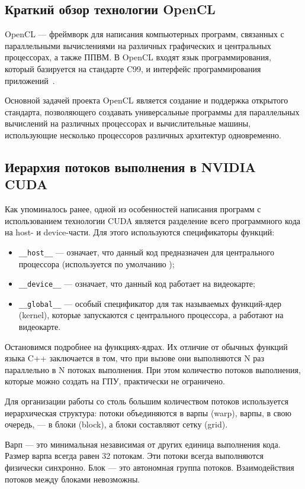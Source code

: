 \subsection{Краткий обзор технологии OpenCL}

OpenCL --- фреймворк для написания компьютерных программ, связанных
с параллельными вычислениями на различных графических и центральных
процессорах, а также ППВМ. В OpenCL входят язык программирования, который базируется на стандарте C99, и интерфейс программирования приложений~\cite{ruwiki:OpenCL}.

Основной задачей проекта OpenCL является создание и поддержка открытого стандарта, позволяющего создавать универсальные программы для параллельных вычислений на различных процессорах и вычислительные машины,
использующие несколько процессоров различных архитектур одновременно.

\subsection{Иерархия потоков выполнения в NVIDIA CUDA}

Как упоминалось ранее, одной из особенностей написания программ с использованием технологии CUDA является разделение всего программного кода
на host- и device-части. Для этого используются спецификаторы функций:
\begin{itemize}
\item \texttt{\_\_host\_\_} --- означает, что данный код предназначен для центрального процессора (используется по умолчанию );
\item \texttt{\_\_device\_\_} --- означает, что данный код работает на видеокарте;
\item \texttt{\_\_global\_\_} --- особый спецификатор для так называемых функций-ядер (kernel), которые запускаются с центрального процессора, а работают на видеокарте.
\end{itemize}

Остановимся подробнее на функциях-ядрах. Их отличие от обычных
функций языка C++ заключается в том, что при вызове они выполняются N раз
параллельно в N потоках выполнения. При этом количество потоков выполнения, которые можно создать на ГПУ, практически не ограничено.

Для организации работы со столь большим количеством потоков используется иерархическая структура: потоки объединяются в варпы (warp), варпы, в
свою очередь, --- в блоки (block), а блоки составляют сетку (grid).

Варп --- это минимальная независимая от других единица выполнения кода. Размер варпа всегда равен 32 потокам. Эти потоки всегда выполняются физически синхронно. Блок --- это автономная группа потоков. Взаимодействия
потоков между блоками невозможны.

